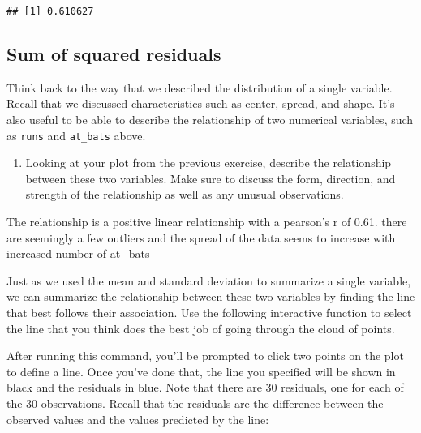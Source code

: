 \documentclass[
]{article}
\newenvironment{Shaded}{\begin{snugshade}}{\end{snugshade}}
\newcommand{\CommentTok}[1]{\textcolor[rgb]{0.56,0.35,0.01}{\textit{#1}}}
\newcommand{\DataTypeTok}[1]{\textcolor[rgb]{0.13,0.29,0.53}{#1}}
\newcommand{\KeywordTok}[1]{\textcolor[rgb]{0.13,0.29,0.53}{\textbf{#1}}}
\newcommand{\NormalTok}[1]{#1}
\newcommand{\OperatorTok}[1]{\textcolor[rgb]{0.81,0.36,0.00}{\textbf{#1}}}
\providecommand{\tightlist}{%
  \setlength{\itemsep}{0pt}\setlength{\parskip}{0pt}}
\begin{document}
\begin{verbatim}
## [1] 0.610627
\end{verbatim}

\hypertarget{sum-of-squared-residuals}{%
\subsection{Sum of squared residuals}\label{sum-of-squared-residuals}}

Think back to the way that we described the distribution of a single
variable. Recall that we discussed characteristics such as center,
spread, and shape. It's also useful to be able to describe the
relationship of two numerical variables, such as \texttt{runs} and
\texttt{at\_bats} above.

\begin{enumerate}
\def\labelenumi{\arabic{enumi}.}
\setcounter{enumi}{1}
\tightlist
\item
  Looking at your plot from the previous exercise, describe the
  relationship between these two variables. Make sure to discuss the
  form, direction, and strength of the relationship as well as any
  unusual observations.
\end{enumerate}

The relationship is a positive linear relationship with a pearson's r of
0.61. there are seemingly a few outliers and the spread of the data
seems to increase with increased number of at\_bats

Just as we used the mean and standard deviation to summarize a single
variable, we can summarize the relationship between these two variables
by finding the line that best follows their association. Use the
following interactive function to select the line that you think does
the best job of going through the cloud of points.

\begin{Shaded}
\end{Shaded}

After running this command, you'll be prompted to click two points on
the plot to define a line. Once you've done that, the line you specified
will be shown in black and the residuals in blue. Note that there are 30
residuals, one for each of the 30 observations. Recall that the
residuals are the difference between the observed values and the values
predicted by the line:
\end{document}
